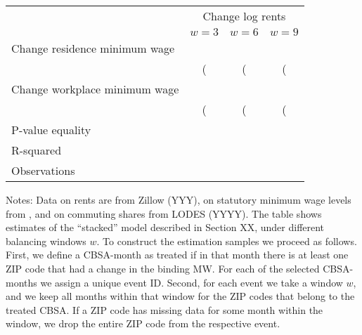 \begin{table}[]
    \caption{Effect of increase in federal MW to \$9 in January 2020}
    \label{tab:stacked}
    \centering

    \begin{table}[]
        \begin{tabular}{@{}lccc@{}}
        \toprule
                                      & \multicolumn{3}{c}{Change log rents} \\ \cmidrule(l){2-4} 
                                      & $w=3$      & $w=6$     & $w=9 $      \\ \midrule
        Change residence minimum wage & #4#        & #4#       &  #4#        \\
                                      & (#4#)      & (#4#)     & (#4#)       \\
        Change workplace minimum wage & #4#        & #4#       & #4#         \\
                                      & (#4#)      & (#4#)     & (#4#)       \\ \midrule
        P-value equality              & #4#        & #4#       & #4#         \\
        R-squared                     & #4#        & #4#       & #4#         \\
        Observations                  & #0,#       & #0,#      & #0,#        \\ \bottomrule
        \end{tabular}
    \end{table}
    
    \begin{minipage}{.95\textwidth} \footnotesize
        \vspace{2mm}
        Notes: Data on rents are from Zillow (YYY), on statutory minimum wage levels from 
        \textcite{VaghulZipperer2016, BerkeleyLaborCenter}, and on commuting shares from
        LODES (YYYY).
        The table shows estimates of the ``stacked'' model described in Section XX, under 
        different balancing windows $w$.
        To construct the estimation samples we proceed as follows.
        First, we define a CBSA-month as treated if in that month there is at least one ZIP 
        code that had a change in the binding MW.
        For each of the selected CBSA-months we assign a unique event ID. 
        Second, for each event we take a window $w$, and we keep all months within that 
        window for the ZIP codes that belong to the treated CBSA.
        If a ZIP code has missing data for some month within the window, we drop the entire 
        ZIP code from the respective event. 
    \end{minipage}
\end{table}
